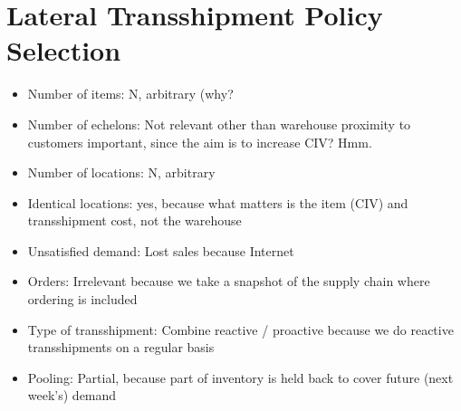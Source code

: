 \documentclass[../../main.tex]{subfiles}
\begin{document}

\section{Lateral Transshipment Policy Selection}

\begin{itemize}
\item Number of items: N, arbitrary (why?
\item Number of echelons: Not relevant other than warehouse proximity to customers important, since the aim is to increase CIV? Hmm.
\item Number of locations: N, arbitrary
\item Identical locations: yes, because what matters is the item (CIV) and transshipment cost, not the warehouse
\item Unsatisfied demand: Lost sales because Internet
\item Orders: Irrelevant because we take a snapshot of the supply chain where ordering is included
\item Type of transshipment: Combine reactive / proactive because we do reactive transshipments on a regular basis
\item Pooling: Partial, because part of inventory is held back to cover future (next week's) demand
\end{itemize}




\end{document}
